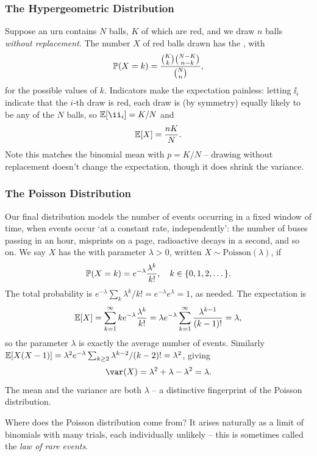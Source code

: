 \documentclass[a4paper]{scrartcl}
\begin{document}
\subsubsection*{The Hypergeometric Distribution}

Suppose an urn contains $N$ balls, $K$ of which are red, and we draw $n$ balls \emph{without replacement}. The number $X$ of red balls drawn has the , with
$$
\mathbb{P}(X = k) = \frac{\binom{K}{k}\binom{N - K}{n - k}}{\binom{N}{n}},
$$
for the possible values of $k$. Indicators make the expectation painless: letting $\ii_i$ indicate that the $i$-th draw is red, each draw is (by symmetry) equally likely to be any of the $N$ balls, so $\EE[\ii_i] = K/N$ and
$$
\mathbb{E}[X] = \frac{nK}{N}.
$$
Note this matches the binomial mean with $p = K/N$ -- drawing without replacement doesn't change the expectation, though it does shrink the variance.

\subsubsection*{The Poisson Distribution}

Our final distribution models the number of events occurring in a fixed window of time, when events occur `at a constant rate, independently': the number of buses passing in an hour, misprints on a page, radioactive decays in a second, and so on. We say $X$ has the  with parameter $\lambda > 0$, written $X \sim \mathrm{Poisson}(\lambda)$, if
$$
\mathbb{P}(X = k) = e^{-\lambda}\frac{\lambda^k}{k!}, \quad k \in \{0, 1, 2, \dots\}.
$$
The total probability is $e^{-\lambda}\sum_k \lambda^k / k! = e^{-\lambda}e^{\lambda} = 1$, as needed. The expectation is
$$
\mathbb{E}[X] = \sum_{k = 1}^{\infty} k e^{-\lambda} \frac{\lambda^k}{k!} = \lambda e^{-\lambda} \sum_{k = 1}^{\infty} \frac{\lambda^{k - 1}}{(k-1)!} = \lambda,
$$
so the parameter $\lambda$ is exactly the average number of events. Similarly $\mathbb{E}[X(X-1)] = \lambda^2 e^{-\lambda}\sum_{k \geq 2} \lambda^{k-2}/(k-2)! = \lambda^2$, giving
$$
\var(X) = \lambda^2 + \lambda - \lambda^2 = \lambda.
$$
The mean and the variance are both $\lambda$ -- a distinctive fingerprint of the Poisson distribution.

Where does the Poisson distribution come from? It arises naturally as a limit of binomials with many trials, each individually unlikely -- this is sometimes called the \emph{law of rare events}.
\end{document}
